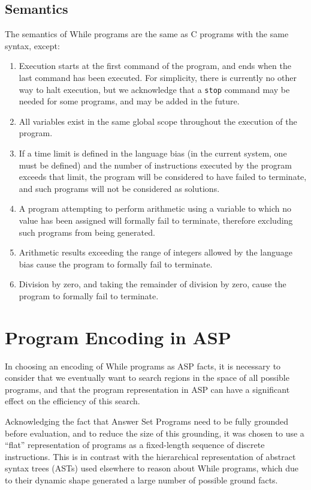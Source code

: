\documentclass[a4paper,twoside,notitlepage]{report}
\newcommand{\ttt}{\texttt}
\begin{document}
\subsection{Semantics}
The semantics of While programs are the same as C programs with the same 
syntax, except:
\begin{enumerate}
    \item Execution starts at the first command of the program, and ends when 
    the last command has been executed. For simplicity, there is currently no 
    other way to halt execution, but we acknowledge that a \ttt{stop} command 
    may be needed for some programs, and may be added in the future.
    \item All variables exist in the same global scope throughout the 
    execution of the program.
    \item If a time limit is defined in the language bias (in the current 
    system, one must be defined) and the number of instructions executed by 
    the program exceeds that limit, the program will be considered to have 
    failed to terminate, and such programs will not be considered as 
solutions.
    \item A program attempting to perform arithmetic using a variable to which
    no value has been assigned will formally fail to terminate, therefore 
    excluding such programs from being generated.
    \item Arithmetic results exceeding the range of integers allowed by the 
    language bias cause the program to formally fail to terminate.
    \item Division by zero, and taking the remainder of division by zero,
    cause the program to formally fail to terminate.
\end{enumerate}

\section{Program Encoding in ASP} \label{sec:progenc}

In choosing an encoding of While programs as ASP facts, it is necessary to 
consider that we eventually want to search regions in the space of all 
possible programs, and that the program representation in ASP can have a 
significant effect on the efficiency of this search.

Acknowledging the fact that Answer Set Programs need to be fully grounded 
before evaluation, and to reduce the size of this grounding, it was chosen 
to use a ``flat'' representation of programs as a fixed-length sequence of 
discrete instructions. This is in contrast with the hierarchical 
representation of abstract syntax trees (ASTs) used elsewhere to reason 
about While programs, which due to their dynamic shape generated a large 
number of possible ground facts.
\end{document}
